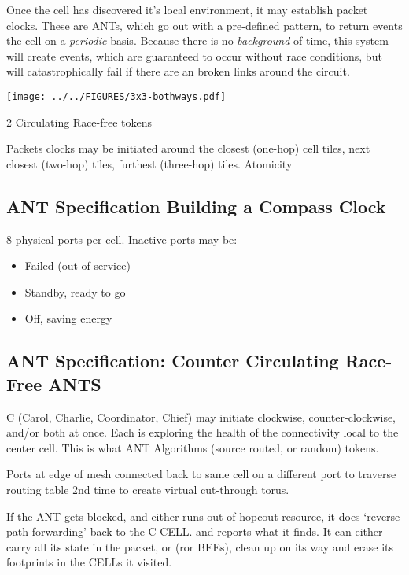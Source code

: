 \documentclass[../HFT-main.tex]{subfiles}
\begin{document}
Once the cell has discovered it's local environment, it may establish packet clocks. These are ANTs, which go out with a pre-defined pattern, to return events the cell on a \emph{periodic} basis.  Because there is no \emph{background} of time, this system will create events, which are guaranteed to occur without race conditions, but will catastrophically fail if there are an broken links around the circuit.

 \begin{marginfigure}
        \texttt{[image: ../../FIGURES/3x3-bothways.pdf]} %
  \caption{2 Circulating Race-free tokens }
    \vspace{10pt}
\end{marginfigure}

Packets clocks may be initiated around  the closest (one-hop) cell tiles, next closest (two-hop) tiles, furthest (three-hop) tiles. Atomicity 

\subsection{ANT Specification Building a Compass Clock}
8 physical ports per cell. 
Inactive ports may be:
\begin{itemize}
\item Failed (out of service)
\item Standby, ready to go
\item Off, saving energy
\end{itemize}

\subsection{ANT Specification: Counter Circulating Race-Free ANTS}

C (Carol, Charlie, Coordinator, Chief) may initiate clockwise, counter-clockwise, and/or both at once. Each is exploring the health of the connectivity local to the center cell. This is what ANT Algorithms (source routed, or random) tokens. 



Ports at edge of mesh connected back to same cell on a different port to traverse routing table 2nd time to create  virtual cut-through torus.

If the ANT gets blocked, and either runs out of hopcout resource, it does `reverse path forwarding' back to the C CELL. and reports what it finds. It can either carry all its state in the packet, or (ror BEEs), clean up on its way and erase its footprints in the CELLs it visited.
\end{document}
